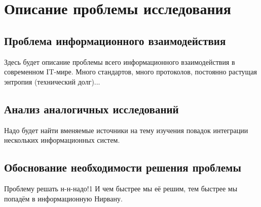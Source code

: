 \section{Описание проблемы исследования}

\subsection{Проблема информационного взаимодействия}

Здесь будет описание проблемы всего информационного взаимодействия в современном IT-мире.
Много стандартов, много протоколов, постоянно растущая энтропия (технический долг)...

\subsection{Анализ аналогичных исследований}

Надо будет найти вменяемые источники на тему изучения повадок интеграции нескольких информационных систем.

\subsection{Обоснование необходимости решения проблемы}

Проблему решать н-н-надо!1
И чем быстрее мы её решим, тем быстрее мы попадём в информационную Нирвану.

\clearpage
\newpage